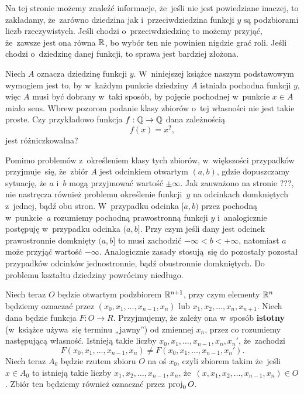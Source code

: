 \documentclass[a4paper,11pt]{article}
\begin{document}
Na tej stronie możemy znaleźć informacje, że~jeśli nie jest powiedziane
inaczej, to zakładamy, że~zarówno dziedzina jak i~przeciwdziedzina funkcji
$y$ są podzbiorami liczb rzeczywistych. Jeśli chodzi o~przeciwdziedzinę
to możemy przyjąć, że~zawsze jest ona równa $\mathbb{R}$, bo wybór ten nie
powinien nigdzie grać roli. Jeśli chodzi o~dziedzinę danej funkcji, to
sprawa jest bardziej złożona.

Niech $A$ oznacza dziedzinę funkcji $y$. W~niniejszej książce naszym
podstawowym wymogiem jest to, by w~każdym punkcie dziedziny $A$ istniała
pochodna funkcji $y$, więc $A$ musi być dobrany w~taki sposób, by pojęcie
pochodnej w~punkcie $x \in A$ miało sens. Wbrew pozorom podanie klasy zbiorów
o~tej własności nie jest takie proste. Czy przykładowo funkcja
$f : \mathbb{Q} \to \mathbb{Q}$ dana zależnością
\begin{equation}
  \label{eq:Matwiejew-Metody-calkowania-ETC-01}
  f( x ) = x^{ 2 },
\end{equation}
jest różniczkowalna?

Pomimo problemów z~określeniem klasy tych zbiorów, w~większości przypadków
przyjmuje~się, że~zbiór $A$ jest odcinkiem otwartym $( a, b )$, gdzie
dopuszczamy sytuację, że $a$ i~$b$ mogą przyjmować wartość $\pm \infty$. Jak
zauważono na stronie ???, nie nastręcza również problemu określenie
funkcji~$y$ na odcinkach domkniętych z~jednej, bądź obu stron. W~przypadku
odcinka $[ a, b )$ przez pochodną w~punkcie~$a$ rozumiemy pochodną
prawostronną funkcji $y$ i~analogicznie postępuję w~przypadku odcinka
$( a, b ]$. Przy czym jeśli dany jest odcinek prawostronnie domknięty
$( a, b ]$ to musi zachodzić $-\infty < b < +\infty$, natomiast $a$ może przyjąć
wartość $-\infty$. Analogicznie zasady stosują~się do pozostały pozostał
przypadków odcinków jednostronnie, bądź obustronnie domkniętych. Do problemu
kształtu dziedziny powrócimy niedługo.

Niech teraz $O$ będzie otwartym podzbiorem $\mathbb{R}^{ n + 1 }$, przy czym
elementy $\mathbb{R}^{ n }$ będziemy oznaczać przez
$( x_{ 0 }, x_{ 1 }, \ldots, x_{ n - 1 }, x_{ n } )$
lub $x_{ 1 }, x_{ 2 }, \ldots, x_{ n }, x_{ n + 1 }$. Niech dana będzie funkcja
$F : O \to R$. Przyjmujemy, że zależy ona w~sposób \textbf{istotny}
(w~książce używa~się terminu „jawny”) od zmiennej $x_{ n }$, przez co
rozumiemy następującą własność. Istnieją takie liczby
$x_{ 0 }, x_{ 1 }, \ldots, x_{ n - 1 }, x_{ n }, x_{ n }'$, że~zachodzi
\begin{equation}
  \label{eq:Matwiejew-Metody-calkowania-ETC-02}
  F( x_{ 0 }, x_{ 1 }, \ldots, x_{ n - 1 }, x_{ n } ) \neq
  F( x_{ 0 }, x_{ 1 }, \ldots, x_{ n - 1 }, x_{ n }' ).
\end{equation}
Niech teraz $A_{ 0 }$ będzie rzutem zbioru $O$ na oś $x_{ 0 }$, czyli zbiorem
takim że~jeśli $x \in A_{ 0 }$ to istnieją takie liczby
$x_{ 1 }, x_{ 2 }, \ldots, x_{ n - 1 }, x_{ n }$,
że~$( x, x_{ 1 }, x_{ 2 }, \ldots, x_{ n - 1 }, x_{ n } ) \in O$. Zbiór ten będziemy
również oznaczać przez $\operatorname{proj}_{ 0 } O$.
\end{document}
